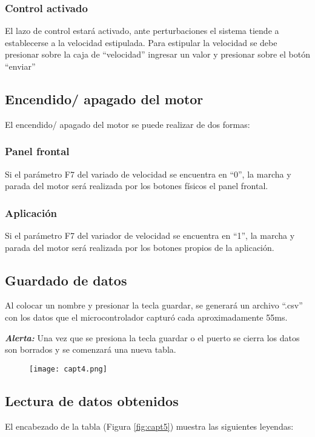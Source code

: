 \subsubsection{Control activado}
El lazo de control estará activado, ante perturbaciones el sistema tiende a establecerse a la velocidad estipulada. Para estipular la velocidad se debe presionar sobre la caja de “velocidad” ingresar un valor y presionar sobre el botón “enviar”

\subsection{Encendido/ apagado del motor}
El encendido/ apagado del motor se puede realizar de dos formas:
\subsubsection{Panel frontal}
Si el parámetro F7 del variado de velocidad se encuentra en “0”, la marcha y parada del motor será realizada por los botones físicos el panel frontal.
\subsubsection{Aplicación}
Si el parámetro F7 del variador de velocidad se encuentra en “1”, la marcha y parada del motor será realizada por los botones propios de la aplicación.


\subsection{Guardado de datos}
Al colocar un nombre y presionar la tecla guardar, se generará un archivo “.csv” con los datos que el microcontrolador capturó cada aproximadamente 55ms. 

\textbf{\textit{Alerta:}} Una vez que se presiona la tecla guardar o el puerto se cierra los datos son borrados y se comenzará una nueva tabla.

\begin{figure}[H]
	\centering
	\texttt{[image: capt4.png]}
	\label{fig:capt4}
\end{figure}


\subsection{Lectura de datos obtenidos}
El encabezado de la tabla (Figura \ref{fig:capt5}) muestra las siguientes leyendas:

